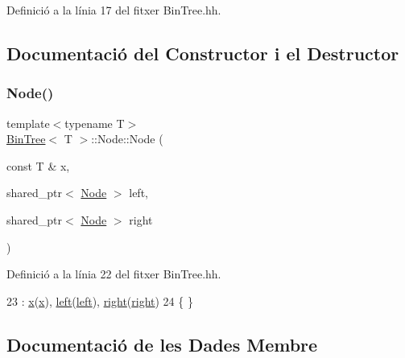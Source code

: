 Definició a la línia 17 del fitxer Bin\+Tree.\+hh.



\subsection{Documentació del Constructor i el Destructor}
\mbox{\label{struct_bin_tree_1_1_node_af45885e303875c018e89fa5c8b96bde0}} 
\subsubsection{\texorpdfstring{Node()}{Node()}}
{\footnotesize\ttfamily template$<$typename T$>$ \\
\hyperlink{class_bin_tree}{Bin\+Tree}$<$ T $>$\+::Node\+::\+Node (\begin{DoxyParamCaption}\item[{const T \&}]{x,  }\item[{shared\+\_\+ptr$<$ \hyperlink{struct_bin_tree_1_1_node}{Node} $>$}]{left,  }\item[{shared\+\_\+ptr$<$ \hyperlink{struct_bin_tree_1_1_node}{Node} $>$}]{right }\end{DoxyParamCaption})}



Definició a la línia 22 del fitxer Bin\+Tree.\+hh.


\begin{DoxyCode}
23         :   \hyperlink{struct_bin_tree_1_1_node_a9c268d4af01559e8237dbeb5bd19af91}{x}(\hyperlink{struct_bin_tree_1_1_node_a9c268d4af01559e8237dbeb5bd19af91}{x}), \hyperlink{struct_bin_tree_1_1_node_a265a6367635a38838e6a6366564be78d}{left}(\hyperlink{struct_bin_tree_1_1_node_a265a6367635a38838e6a6366564be78d}{left}), \hyperlink{struct_bin_tree_1_1_node_a6df770137090da60cd0376ce06893cbd}{right}(\hyperlink{struct_bin_tree_1_1_node_a6df770137090da60cd0376ce06893cbd}{right})
24         \{   \}
\end{DoxyCode}


\subsection{Documentació de les Dades Membre}
\mbox{\label{struct_bin_tree_1_1_node_a9c268d4af01559e8237dbeb5bd19af91}} 
